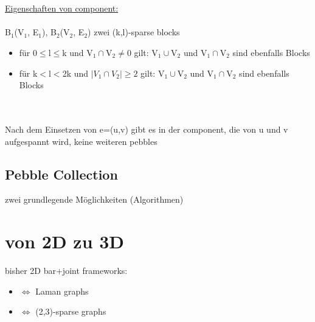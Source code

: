 \documentclass[12pt,a4paper]{article}
\begin{document}
\\\\
\underline{Eigenschaften von component:}\\\\
B$_1$(V$_1$, E$_1$), B$_2$(V$_2$, E$_2$) zwei (k,l)-sparse blocks
\begin{itemize}
	\item für 0$\leq$l$\leq$k und V$_1 \cap$V$_2 \neq$0 gilt: V$_1 \cup$V$_2$ und V$_1 \cap$V$_2$ sind ebenfalls Blocks
	\item für k$<$l$<$2k und $|V_1\cap V_2|\geq 2$ gilt: V$_1 \cup$V$_2$ und V$_1 \cap$V$_2$ sind ebenfalls Blocks
\end{itemize}

\\\\
Nach dem Einsetzen von e=(u,v) gibt es in der component, die von u und v aufgespannt wird, keine weiteren pebbles
\subsection{Pebble Collection}
zwei grundlegende Möglichkeiten (Algorithmen)

\section{von 2D zu 3D}
bisher 2D bar+joint frameworks:
\begin{itemize}
	\item $\Leftrightarrow$ Laman graphs
	\item $\Leftrightarrow$ (2,3)-sparse graphs
\end{itemize}
\end{document}
